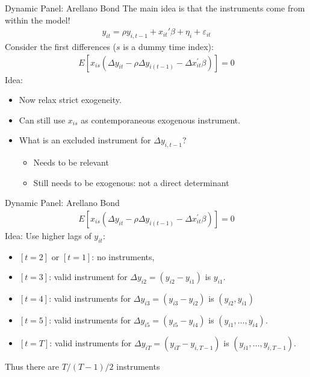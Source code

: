 \documentclass[xcolor=pdftex,dvipsnames,table,mathserif,aspectratio=169]{beamer}
\begin{document}
\begin{frame}{Dynamic Panel: Arellano Bond}
The main idea is that the \alert{instruments come from within the model}!
\begin{eqnarray*}
y_{it} = \rho y_{i,t-1} + x_{it}'\beta + \eta_i + \varepsilon_{it}
\end{eqnarray*}
Consider the first differences ($s$ is a dummy time index):
\begin{eqnarray*}
E\left[x_{i s}\left(\Delta y_{i t}-\rho \Delta y_{i(t-1)}-\Delta x_{i t}^{\prime} \beta\right)\right]=0
\end{eqnarray*}
Idea:
\begin{itemize}
\item Now relax \alert{strict exogeneity}.
\item Can still use $x_{is}$ as contemporaneous exogenous instrument.
\item What is an excluded instrument for $\Delta y_{i,t-1}$?
\begin{itemize}
\item Needs to be \alert{relevant}
\item Still needs to be \alert{exogenous}: not a direct determinant
\end{itemize}
\end{itemize}
\end{frame}

\begin{frame}{Dynamic Panel: Arellano Bond}
\begin{eqnarray*}
E\left[x_{i s}\left(\Delta y_{i t}-\rho \Delta y_{i(t-1)}-\Delta x_{i t}^{\prime} \beta\right)\right]=0
\end{eqnarray*}
Idea: Use higher lags of $y_{it}$:
\begin{itemize}
\item $[t=2]$ or $[t=1]$: no instruments,
\item $[t=3]$:  valid instrument for $\Delta y_{i2} = (y_{i2}-y_{i1})$ is $y_{i1}$.
\item $[t=4]$:  valid instruments for $\Delta y_{i3} = (y_{i3}-y_{i2})$ is $(y_{i2}, y_{i1})$
\item$[t=5]$:  valid instruments for $\Delta y_{i5} = (y_{i5}-y_{i4})$ is $(y_{i1},\ldots, y_{i4})$.
\item$[t=T]$:  valid instruments for $\Delta y_{iT} = (y_{iT}-y_{i,T-1})$ is $(y_{i1},\ldots, y_{i,T-1})$.
\end{itemize}
Thus there are $T/(T-1)/2$ instruments
\end{frame}
\end{document}
